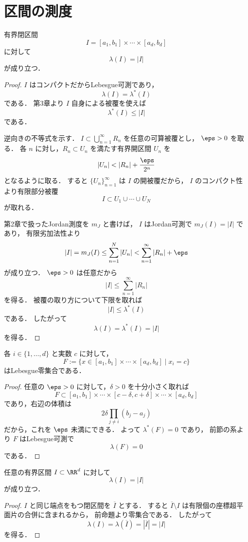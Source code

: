 \section{区間の測度}

\begin{theorem}[閉区間の測度]
有界閉区間
\[
I = [a_1,b_1] \times \cdots \times [a_d,b_d]
\]
に対して
\[
\lambda(I)=|I|
\]
が成り立つ．
\end{theorem}
\begin{proof}
$I$ はコンパクトだからLebesgue可測であり，
\[
\lambda(I)=\lambda^*(I)
\]
である．
第3章より $I$ 自身による被覆を使えば
\[
\lambda^*(I)\le |I|
\]
である．

逆向きの不等式を示す．
$I \subset \bigcup_{n=1}^{\infty} R_n$ を任意の可算被覆とし，
$\eps>0$ を取る．
各 $n$ に対し，$R_n \subset U_n$ を満たす有界開区間 $U_n$ を
\[
|U_n|<|R_n|+\frac{\eps}{2^n}
\]
となるように取る．
すると $\{U_n\}_{n=1}^{\infty}$ は $I$ の開被覆だから，
$I$ のコンパクト性より有限部分被覆
\[
I \subset U_1 \cup \cdots \cup U_N
\]
が取れる．

第2章で扱ったJordan測度を $m_J$ と書けば，
$I$ はJordan可測で $m_J(I)=|I|$ であり，
有限劣加法性より
\[
|I|
=
m_J(I)
\le
\sum_{n=1}^N |U_n|
<
\sum_{n=1}^{\infty}|R_n|+\eps
\]
が成り立つ．
$\eps>0$ は任意だから
\[
|I|\le \sum_{n=1}^{\infty}|R_n|
\]
を得る．
被覆の取り方について下限を取れば
\[
|I| \le \lambda^*(I)
\]
である．
したがって
\[
\lambda(I)=\lambda^*(I)=|I|
\]
を得る．
\end{proof}

\begin{proposition}[座標超平面片は零集合]
各 $i \in \{1,\dots,d\}$ と実数 $c$ に対して，
\[
F
:=
\{x \in [a_1,b_1]\times\cdots\times[a_d,b_d] \mid x_i=c\}
\]
はLebesgue零集合である．
\end{proposition}
\begin{proof}
任意の $\eps>0$ に対して，$\delta>0$ を十分小さく取れば
\[
F
\subset
[a_1,b_1]\times\cdots\times[c-\delta,c+\delta]\times\cdots\times[a_d,b_d]
\]
であり，右辺の体積は
\[
2\delta \prod_{j\ne i}(b_j-a_j)
\]
だから，これを $\eps$ 未満にできる．
よって $\lambda^*(F)=0$ であり，
前節の系より $F$ はLebesgue可測で
\[
\lambda(F)=0
\]
である．
\end{proof}

\begin{corollary}[有界区間の測度]
任意の有界区間 $I \subset \RR^d$ に対して
\[
\lambda(I)=|I|
\]
が成り立つ．
\end{corollary}
\begin{proof}
$I$ と同じ端点をもつ閉区間を $\overline I$ とする．
すると $\overline I \setminus I$ は有限個の座標超平面片の合併に含まれるから，
前命題より零集合である．
したがって
\[
\lambda(I)=\lambda(\overline I)=|\overline I|=|I|
\]
を得る．
\end{proof}

